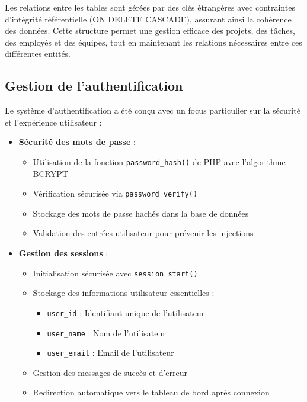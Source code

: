 \documentclass[12pt,a4paper]{article}
\begin{document}
Les relations entre les tables sont gérées par des clés étrangères avec contraintes d'intégrité référentielle (ON DELETE CASCADE), assurant ainsi la cohérence des données. Cette structure permet une gestion efficace des projets, des tâches, des employés et des équipes, tout en maintenant les relations nécessaires entre ces différentes entités.

\subsection{Gestion de l'authentification}
Le système d'authentification a été conçu avec un focus particulier sur la sécurité et l'expérience utilisateur :

\begin{itemize}
    \item \textbf{Sécurité des mots de passe} :
    \begin{itemize}
        \item Utilisation de la fonction \texttt{password\_hash()} de PHP avec l'algorithme BCRYPT
        \item Vérification sécurisée via \texttt{password\_verify()}
        \item Stockage des mots de passe hachés dans la base de données
        \item Validation des entrées utilisateur pour prévenir les injections
    \end{itemize}

    \item \textbf{Gestion des sessions} :
    \begin{itemize}
        \item Initialisation sécurisée avec \texttt{session\_start()}
        \item Stockage des informations utilisateur essentielles :
        \begin{itemize}
            \item \texttt{user\_id} : Identifiant unique de l'utilisateur
            \item \texttt{user\_name} : Nom de l'utilisateur
            \item \texttt{user\_email} : Email de l'utilisateur
        \end{itemize}
        \item Gestion des messages de succès et d'erreur
        \item Redirection automatique vers le tableau de bord après connexion
    \end{itemize}


\end{itemize}
\end{document}
